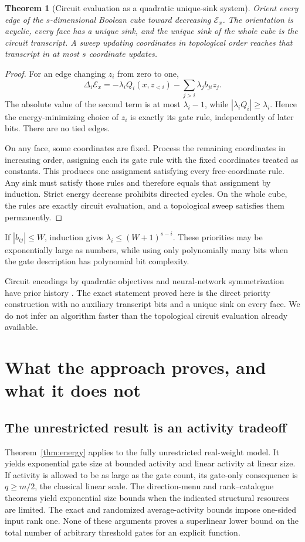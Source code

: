 \documentclass[11pt]{article}
\newtheorem{theorem}{Theorem}[section]
\theoremstyle{definition}
\begin{document}
\begin{theorem}[Circuit evaluation as a quadratic unique-sink system]\label{thm:potential}
Orient every edge of the \(s\)-dimensional Boolean cube toward decreasing \(\mathcal E_x\).
The orientation is acyclic, every face has a unique sink, and the unique sink of the whole cube is the circuit transcript.
A sweep updating coordinates in topological order reaches that transcript in at most \(s\) coordinate updates.
\end{theorem}
\begin{proof}
For an edge changing \(z_i\) from zero to one,
\[
 \Delta_i\mathcal E_x
 =-\lambda_iQ_i(x,z_{<i})
   -\sum_{j>i}\lambda_jb_{ji}z_j.                        \tag{27}
\]
The absolute value of the second term is at most \(\lambda_i-1\), while
\(|\lambda_iQ_i|\ge\lambda_i\). Hence the energy-minimizing choice of \(z_i\) is exactly its gate rule, independently of later bits. There are no tied edges.

On any face, some coordinates are fixed. Process the remaining coordinates in increasing order, assigning each its gate rule with the fixed coordinates treated as constants. This produces one assignment satisfying every free-coordinate rule. Any sink must satisfy those rules and therefore equals that assignment by induction. Strict energy decrease prohibits directed cycles. On the whole cube, the rules are exactly circuit evaluation, and a topological sweep satisfies them permanently.
\end{proof}

If \(|b_{ij}|\le W\), induction gives \(\lambda_i\le(W+1)^{s-i}\). These priorities may be exponentially large as numbers, while using only polynomially many bits when the gate description has polynomial bit complexity.

Circuit encodings by quadratic objectives and neural-network symmetrization have prior history \cite{CB92,Orponen96}. The exact statement proved here is the direct priority construction with no auxiliary transcript bits and a unique sink on every face. We do not infer an algorithm faster than the topological circuit evaluation already available.

\section{What the approach proves, and what it does not}\label{sec:limits}
\subsection{The unrestricted result is an activity tradeoff}
Theorem~\ref{thm:energy} applies to the fully unrestricted real-weight model. It yields exponential gate size at bounded activity and linear activity at linear size. If activity is allowed to be as large as the gate count, its gate-only consequence is \(q\ge m/2\), the classical linear scale. The direction-menu and rank--catalogue theorems yield exponential size bounds when the indicated structural resources are limited. The exact and randomized average-activity bounds impose one-sided input rank one. None of these arguments proves a superlinear lower bound on the total number of arbitrary threshold gates for an explicit function.
\end{document}
